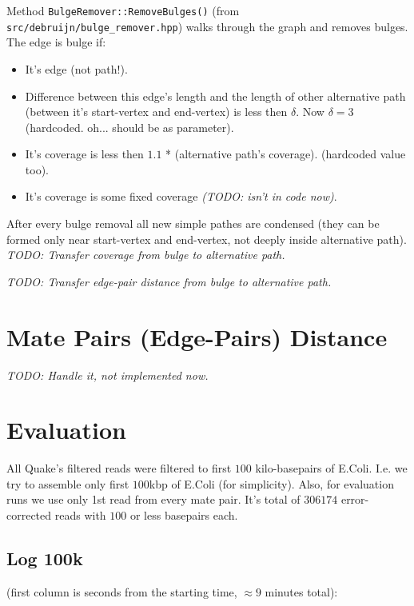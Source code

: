 \documentclass[14pt]{article}
\begin{document}
Method \texttt{BulgeRemover::RemoveBulges()} (from \texttt{src/debruijn/bulge\_remover.hpp}) walks through the graph and removes bulges. The edge is bulge if:
\begin{itemize}
\item It's edge (not path!).
\item Difference between this edge's length and the length of other alternative path (between it's start-vertex and end-vertex) is less then $\delta$. Now $\delta = 3$ (hardcoded. oh... should be as parameter).
\item It's coverage is less then $1.1$ * (alternative path's coverage). (hardcoded value too).
\item It's coverage is some fixed coverage \textit{(TODO: isn't in code now)}.
\end{itemize} \vspace{0.5 cm}

After every bulge removal all new simple pathes are condensed (they can be formed only near start-vertex and end-vertex, not deeply inside alternative path). \\

\textit{TODO: Transfer coverage from bulge to alternative path.}

\textit{TODO: Transfer edge-pair distance from bulge to alternative path.}

\section{Mate Pairs (Edge-Pairs) Distance}

\textit{TODO: Handle it, not implemented now.}

\section{Evaluation}

All Quake's filtered reads were filtered to first $100$ kilo-basepairs of E.Coli. I.e. we try to assemble only first $100$kbp of E.Coli (for simplicity). Also, for evaluation runs we use only 1st read from every mate pair. It's total of $306174$ error-corrected reads with $100$ or less basepairs each.

\subsection{Log 100k}
(first column is seconds from the starting time, $\approx 9$ minutes total): \\
\end{document}
